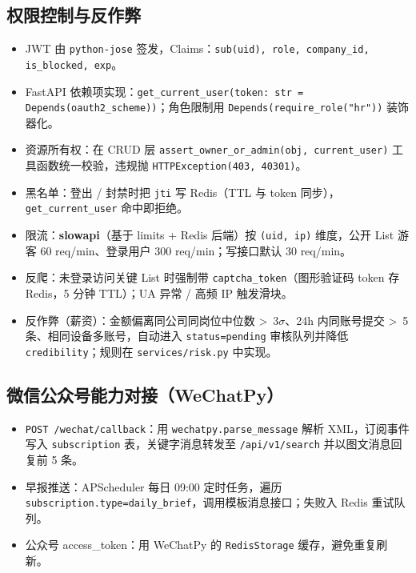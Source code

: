 \documentclass[11pt,a4paper]{ctexart}
\begin{document}
\subsection{权限控制与反作弊}
\begin{itemize}[leftmargin=2em]
    \item JWT 由 \texttt{python-jose} 签发，Claims：\texttt{sub(uid), role, company\_id, is\_blocked, exp}。
    \item FastAPI 依赖项实现：\texttt{get\_current\_user(token: str = Depends(oauth2\_scheme))}；角色限制用 \texttt{Depends(require\_role("hr"))} 装饰器化。
    \item 资源所有权：在 CRUD 层 \texttt{assert\_owner\_or\_admin(obj, current\_user)} 工具函数统一校验，违规抛 \texttt{HTTPException(403, 40301)}。
    \item 黑名单：登出 / 封禁时把 \texttt{jti} 写 Redis（TTL 与 token 同步），\texttt{get\_current\_user} 命中即拒绝。
    \item 限流：\textbf{slowapi}（基于 limits + Redis 后端）按 \texttt{(uid, ip)} 维度，公开 List 游客 60 req/min、登录用户 300 req/min；写接口默认 30 req/min。
    \item 反爬：未登录访问关键 List 时强制带 \texttt{captcha\_token}（图形验证码 token 存 Redis，5 分钟 TTL）；UA 异常 / 高频 IP 触发滑块。
    \item 反作弊（薪资）：金额偏离同公司同岗位中位数 \textgreater~3$\sigma$、24h 内同账号提交 \textgreater~5 条、相同设备多账号，自动进入 \texttt{status=pending} 审核队列并降低 \texttt{credibility}；规则在 \texttt{services/risk.py} 中实现。
\end{itemize}

\subsection{微信公众号能力对接（WeChatPy）}
\begin{itemize}[leftmargin=2em]
    \item \texttt{POST /wechat/callback}：用 \texttt{wechatpy.parse\_message} 解析 XML，订阅事件写入 \texttt{subscription} 表，关键字消息转发至 \texttt{/api/v1/search} 并以图文消息回复前 5 条。
    \item 早报推送：APScheduler 每日 09:00 定时任务，遍历 \texttt{subscription.type=daily\_brief}，调用模板消息接口；失败入 Redis 重试队列。
    \item 公众号 access\_token：用 WeChatPy 的 \texttt{RedisStorage} 缓存，避免重复刷新。
\end{itemize}
\end{document}
